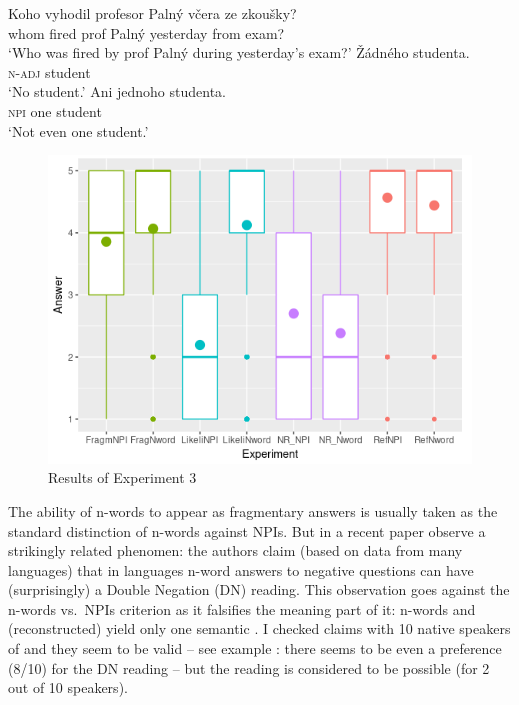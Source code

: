 \documentclass[output=paper, colorlinks, citecolor=brown, newtxmath]{langsci/langscibook}
\begin{document}
\ea \label{ex-35} \gll Koho vyhodil profesor Palný včera ze zkoušky?\\
whom fired prof Palný yesterday from exam?\\
\glt `Who was fired by prof Palný during yesterday's exam?'
\ea \gll Žádného studenta.\\
\textsc{n-adj} student\\
\glt `No student.'
\ex \gll Ani jednoho studenta.\\
\textsc{npi} one student\\
\glt `Not even one student.'
\z
\z

\begin{figure}
\centering
\includegraphics[scale=0.8]{figures/Rplot04.png}
\caption{Results of Experiment 3}\label{fig:exp3}
\end{figure}

\noindent The ability of n-words to appear as fragmentary answers is usually taken as the standard distinction of n-words against NPIs. But in a recent paper  \cite{fualuaus2016fragment} observe a strikingly related phenomen: the authors claim (based on data from many  languages) that in  languages n-word answers to negative questions can have (surprisingly) a Double Negation (DN) reading. This observation goes against the n-words vs.~NPIs criterion as it falsifies the meaning part of it: n-words and (reconstructed)  yield only one semantic . I checked  claims with 10 native speakers of  and they seem to be valid -- see example : there seems to be even a preference (8/10) for the DN reading --  but the  reading  is considered to be possible (for 2 out of 10 speakers).
\end{document}
